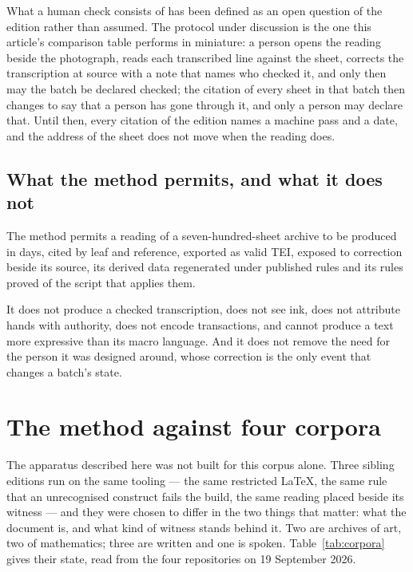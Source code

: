 \documentclass[11pt]{article}
\begin{document}
What a human check consists of has been defined as an open question of the edition rather than assumed. The protocol under discussion is the one this article's comparison table performs in miniature: a person opens the reading beside the photograph, reads each transcribed line against the sheet, corrects the transcription at source with a note that names who checked it, and only then may the batch be declared checked; the citation of every sheet in that batch then changes to say that a person has gone through it, and only a person may declare that. Until then, every citation of the edition names a machine pass and a date, and the address of the sheet does not move when the reading does.



\subsection{What the method permits, and what it does not}

The method permits a reading of a seven-hundred-sheet archive to be produced in days, cited by leaf and reference, exported as valid TEI, exposed to correction beside its source, its derived data regenerated under published rules and its rules proved of the script that applies them.

It does not produce a checked transcription, does not see ink, does not attribute hands with authority, does not encode transactions, and cannot produce a text more expressive than its macro language. And it does not remove the need for the person it was designed around, whose correction is the only event that changes a batch's state.

\section{The method against four corpora}

The apparatus described here was not built for this corpus alone. Three sibling
editions run on the same tooling — the same restricted LaTeX, the same rule that
an unrecognised construct fails the build, the same reading placed beside its
witness — and they were chosen to differ in the two things that matter: what the
document is, and what kind of witness stands behind it. Two are archives of art,
two of mathematics; three are written and one is spoken. Table~\ref{tab:corpora}
gives their state, read from the four repositories on 19 September 2026.
\end{document}
